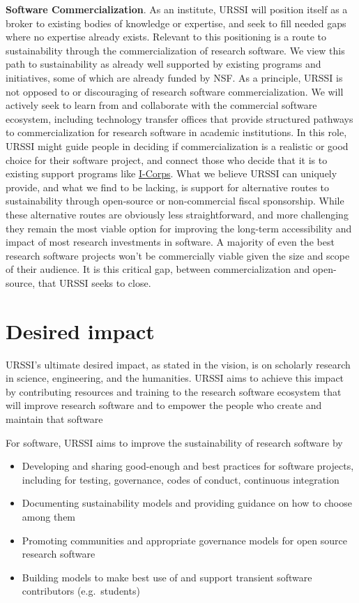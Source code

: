 \documentclass[
]{book}
\begin{document}
\textbf{Software Commercialization}. As an institute, URSSI will position
itself as a broker to existing bodies of knowledge or expertise, and
seek to fill needed gaps where no expertise already exists. Relevant
to this positioning is a route to sustainability through the
commercialization of research software. We view this path to sustainability
as already well supported by existing programs and initiatives, some of
which are already funded by NSF. As a principle, URSSI is not opposed
to or discouraging of research software commercialization. We will actively
seek to learn from and collaborate with the commercial software ecosystem,
including technology transfer offices that provide structured pathways to
commercialization for research software in academic institutions. In this
role, URSSI might guide people in deciding if commercialization is a
realistic or good choice for their software project, and connect those who
decide that it is to existing support programs like
\href{https://www.nsf.gov/news/special_reports/i-corps/}{I-Corps}. What we believe
URSSI can uniquely provide, and what we find to be lacking, is support for
alternative routes to sustainability through open-source or non-commercial
fiscal sponsorship. While these alternative routes are obviously less
straightforward, and more challenging they remain the most viable option for
improving the long-term accessibility and impact of most research
investments in software. A majority of even the best research software projects
won't be commercially viable given the size and scope of their audience. It is
this critical gap, between commercialization and open-source, that URSSI seeks
to close.

\hypertarget{desired-impact}{%
\section{Desired impact}\label{desired-impact}}

URSSI's ultimate desired impact, as stated in the vision, is on scholarly
research in science, engineering, and the humanities. URSSI aims to achieve
this impact by contributing resources and training to the research software
ecosystem that will improve research software and to empower the people who
create and maintain that software

For software, URSSI aims to improve the sustainability of research software by

\begin{itemize}
\item
  Developing and sharing good-enough and best practices for software projects,
  including for testing, governance, codes of conduct, continuous integration
\item
  Documenting sustainability models and providing guidance on how to choose among them
\item
  Promoting communities and appropriate governance models for open source research software
\item
  Building models to make best use of and support transient software contributors (e.g.~students)
\end{itemize}
\end{document}
